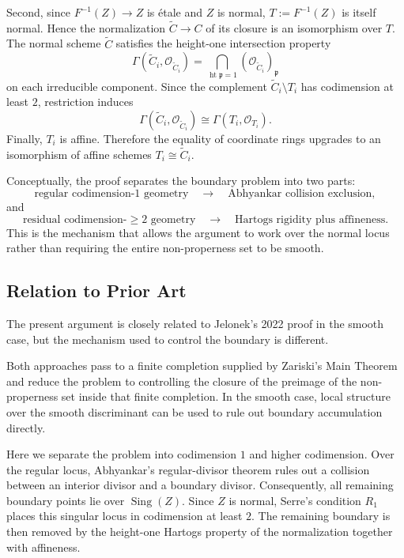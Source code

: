 \documentclass[11pt,reqno]{amsart}
\theoremstyle{plain}
\theoremstyle{definition}
\numberwithin{equation}{section}
\DeclareMathOperator{\Sing}{Sing}
\newcommand{\cO}{\mathcal{O}}
\newcommand{\fp}{\mathfrak{p}}
\begin{document}
Second, since $F^{-1}(Z) \to Z$ is \'{e}tale and $Z$ is normal, $T := F^{-1}(Z)$ is itself normal.  Hence the normalization $\widetilde{C} \to C$ of its closure is an isomorphism over $T$. The normal scheme $\widetilde{C}$ satisfies the height-one intersection property
\[
\Gamma(\widetilde{C}_i, \cO_{\widetilde{C}_i}) = \bigcap_{\operatorname{ht}\fp=1} (\cO_{\widetilde{C}_i})_\fp
\]
on each irreducible component.  Since the complement $\widetilde{C}_i \setminus T_i$ has codimension at least $2$, restriction induces
\[
\Gamma(\widetilde{C}_i, \cO_{\widetilde{C}_i}) \cong \Gamma(T_i, \cO_{T_i}).
\]
Finally, $T_i$ is affine.  Therefore the equality of coordinate rings upgrades to an isomorphism of affine schemes $T_i \cong \widetilde{C}_i$.

Conceptually, the proof separates the boundary problem into two parts:
\[
\text{regular codimension-$1$ geometry} \quad\longrightarrow\quad \text{Abhyankar collision exclusion},
\]
and
\[
\text{residual codimension-$\ge 2$ geometry} \quad\longrightarrow\quad \text{Hartogs rigidity plus affineness}.
\]
This is the mechanism that allows the argument to work over the normal locus rather than requiring the entire non-properness set to be smooth.

\subsection{Relation to Prior Art}

The present argument is closely related to Jelonek's 2022 proof in the smooth case, but the mechanism used to control the boundary is different.

Both approaches pass to a finite completion supplied by Zariski's Main Theorem and reduce the problem to controlling the closure of the preimage of the non-properness set inside that finite completion.  In the smooth case, local structure over the smooth discriminant can be used to rule out boundary accumulation directly.

Here we separate the problem into codimension $1$ and higher codimension. Over the regular locus, Abhyankar's regular-divisor theorem rules out a collision between an interior divisor and a boundary divisor.  Consequently, all remaining boundary points lie over $\Sing(Z)$.  Since $Z$ is normal, Serre's condition $R_1$ places this singular locus in codimension at least $2$. The remaining boundary is then removed by the height-one Hartogs property of the normalization together with affineness.
\end{document}
